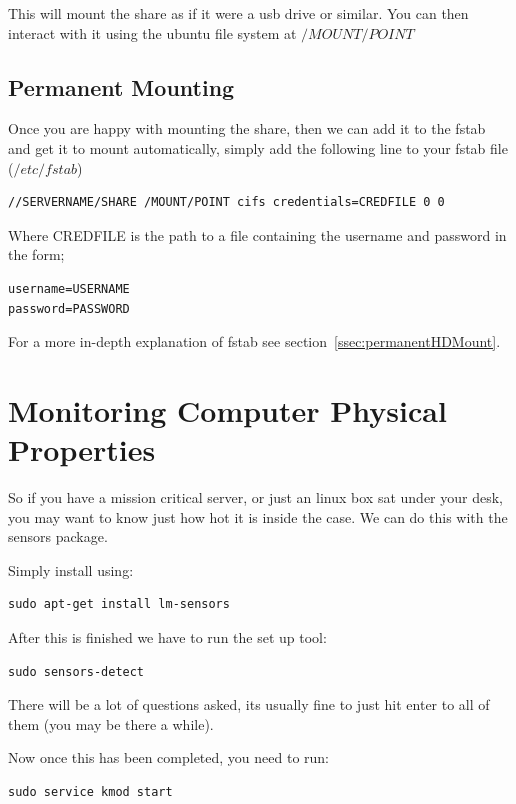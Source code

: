 This will mount the share as if it were a usb drive or similar.  You can then interact with it using the ubuntu file system at $/MOUNT/POINT$

\subsection{Permanent Mounting}

Once you are happy with mounting the share, then we can add it to the fstab and get it to mount automatically, simply add the following line to your fstab file ($/etc/fstab$)

\begin{verbatim}
//SERVERNAME/SHARE /MOUNT/POINT cifs credentials=CREDFILE 0 0
\end{verbatim}

Where CREDFILE is the path to a file containing the username and password in the form;

\begin{verbatim}
username=USERNAME
password=PASSWORD
\end{verbatim}

For a more in-depth explanation of fstab see section~\ref{ssec:permanentHDMount}.


\section{Monitoring Computer Physical Properties}
\label{sec:physicalmon}

So if you have a mission critical server, or just an linux box sat under your desk, you may want to know just how hot it is inside the case.  We can do this with the sensors package.

Simply install using:

\begin{lstlisting}
sudo apt-get install lm-sensors
\end{lstlisting}

After this is finished we have to run the set up tool:

\begin{lstlisting}
sudo sensors-detect
\end{lstlisting}

There will be a lot of questions asked, its usually fine to just hit enter to all of them (you may be there a while).

Now once this has been completed, you need to run:

\begin{lstlisting}
sudo service kmod start
\end{lstlisting}

